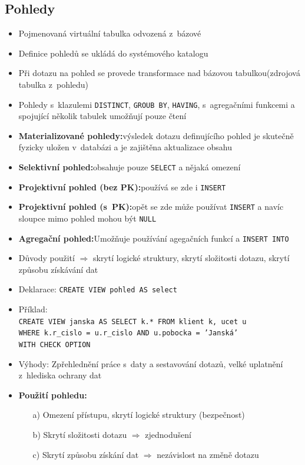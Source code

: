\documentclass[a4paper,10pt]{article}
\newcommand{\pojem}[2]{\item \textbf{#1:}\quad #2}
\newcommand{\tedy}{$\Rightarrow$ }
\begin{document}
    \subsection{Pohledy}
      \begin{itemize}
        \item Pojmenovaná virtuální tabulka odvozená z~bázové
        \item Definice pohledů se ukládá do systémového katalogu
        \item Při dotazu na pohled se provede transformace nad bázovou tabulkou(zdrojová tabulka z~pohledu)
        \item Pohledy s~klazulemi \texttt{DISTINCT}, \texttt{GROUB BY}, \texttt{HAVING}, s~agregačními funkcemi a spojující několik tabulek umožňují pouze čtení

        \pojem{Materializované pohledy}{výsledek dotazu definujícího pohled je skutečně fyzicky uložen v~databázi a je zajištěna aktualizace obsahu}
        \pojem{Selektivní pohled}{obsahuje pouze \texttt{SELECT} a nějaká omezení}
        \pojem{Projektivní pohled (bez PK)}{používá se zde i \texttt{INSERT}}
        \pojem{Projektivní pohled (s~PK)}{opět se zde může používat \texttt{INSERT} a navíc sloupce mimo pohled mohou být \texttt{NULL}}
        \pojem{Agregační pohled}{Umožňuje  používání agegačních funkcí a \texttt{INSERT INTO}}

        \item Důvody použití \tedy skrytí logické struktury, skrytí složitosti dotazu, skrytí způsobu získávání dat
        \item Deklarace: \texttt{CREATE VIEW pohled AS select}
        \item Příklad: \\ \texttt{CREATE VIEW janska AS SELECT k.* FROM klient k, ucet u} \\
          \texttt{WHERE k.r\_cislo = u.r\_cislo AND u.pobocka = 'Janská'} \\
          \texttt{WITH CHECK OPTION} \\
        \item Výhody: Zpřehlednění práce s~daty a sestavování dotazů, velké uplatnění z~hlediska ochrany dat
        \pojem{Použití pohledu}
        \begin{itemize}
          \item[a)] Omezení přístupu, skrytí logické struktury (bezpečnost)
          \item[b)] Skrytí složitosti dotazu \tedy zjednodušení
          \item[c)] Skrytí způsobu získání dat \tedy nezávislost na změně dotazu
        \end{itemize}
      \end{itemize}
\end{document}
